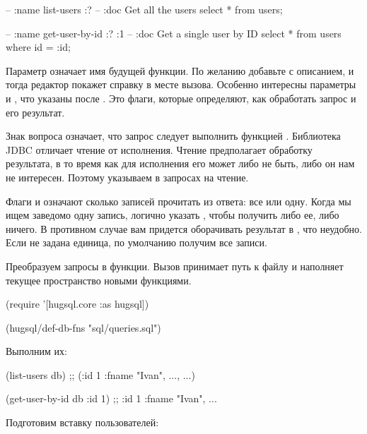 \begin{english}
  \begin{sql}
-- :name list-users :?
-- :doc Get all the users
select * from users;

-- :name get-user-by-id :? :1
-- :doc Get a single user by ID
select * from users
where id = :id;
  \end{sql}
\end{english}

Параметр  означает имя будущей функции. По желанию добавьте  с описанием, и тогда редактор покажет справку в месте вызова. Особенно интересны параметры  и , что указаны после . Это флаги, которые определяют, как обработать запрос и его результат.

Знак вопроса означает, что запрос следует выполнить функцией . Библиотека JDBC отличает чтение от исполнения. Чтение предполагает обработку результата, в то время как для исполнения его может либо не быть, либо он нам не интересен. Поэтому указываем  в запросах на чтение.

Флаги \code{:*} и  означают сколько записей прочитать из ответа: все или одну. Когда мы ищем заведомо одну запись, логично указать , чтобы получить либо ее, либо ничего. В противном случае вам придется оборачивать результат в , что неудобно. Если не задана единица, по умолчанию получим все записи.

Преобразуем запросы в функции. Вызов  принимает путь к файлу и наполняет текущее пространство новыми функциями.

\begin{english}
  \begin{clojure}
(require '[hugsql.core :as hugsql])

(hugsql/def-db-fns "sql/queries.sql")
  \end{clojure}
\end{english}

Выполним их:

\begin{english}
  \begin{clojure}
(list-users db)
;; ({:id 1 :fname "Ivan", ...}, ...)

(get-user-by-id db {:id 1})
;; {:id 1 :fname "Ivan", ...}
  \end{clojure}
\end{english}

Подготовим вставку пользователей:

